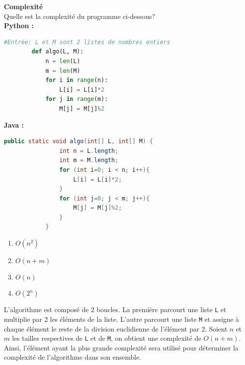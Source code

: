 \begin{Exercice}[10 minutes] \textbf{Complexité} \\
    Quelle est la complexité du programme ci-dessous?\\
        \textbf{Python :}
        \begin{lstlisting}[language=Python]
        #Entrée: L et M sont 2 listes de nombres entiers
        def algo(L, M):
            n = len(L)
            m = len(M)
            for i in range(n):
                L[i] = L[i]*2
            for j in range(m):
                M[j] = M[j]%2
        \end{lstlisting}
        
        \textbf{Java :}
        \begin{lstlisting}[language=Java]
            public static void algo(int[] L, int[] M) {
                int n = L.length;
                int m = M.length;
                for (int i=0; i < n; i++){
                    L[i] = L[i]*2;
                }
                for (int j=0; j < m; j++){
                    M[j] = M[j]%2;
                }
            }
        \end{lstlisting}

        \begin{enumerate}
            \item $O(n^2)$
            \item $O(n + m)$
            \item $O(n)$
            \item $O(2^n)$
        \end{enumerate}

        \begin{solution}
        L'algorithme est composé de 2 boucles. La première parcourt une liste \lstinline{L} et multiplie par 2 les éléments de la liste. 
        L'autre parcourt une liste \lstinline{M} et assigne à chaque élément le reste de la division euclidienne de l'élément par 2. 
        Soient $n$ et $m$ les tailles respectives de \lstinline{L} et de \lstinline{M}, on obtient une complexité de $O(n + m)$. 
        Ainsi, l'élément ayant la plus grande complexité sera utilisé pour déterminer la complexité de l'algorithme dans son ensemble.
        \end{solution}
\end{Exercice}

